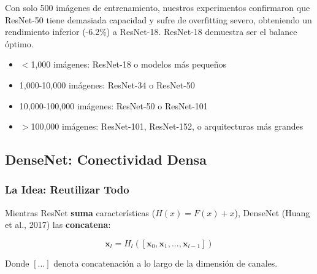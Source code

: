 \documentclass[12pt,a4paper]{article}
\begin{document}
Con solo 500 imágenes de entrenamiento, nuestros experimentos confirmaron que ResNet-50 tiene demasiada capacidad y sufre de overfitting severo, obteniendo un rendimiento inferior (-6.2\%) a ResNet-18. ResNet-18 demuestra ser el balance óptimo.

\begin{tipbox}
\begin{itemize}
    \item $<$1,000 imágenes: ResNet-18 o modelos más pequeños
    \item 1,000-10,000 imágenes: ResNet-34 o ResNet-50
    \item 10,000-100,000 imágenes: ResNet-50 o ResNet-101
    \item $>$100,000 imágenes: ResNet-101, ResNet-152, o arquitecturas más grandes
\end{itemize}
\end{tipbox}

\subsection{DenseNet: Conectividad Densa}

\subsubsection{La Idea: Reutilizar Todo}

Mientras ResNet \textbf{suma} características ($H(x) = F(x) + x$), DenseNet (Huang et al., 2017) las \textbf{concatena}:

\begin{equation}
\mathbf{x}_l = H_l([\mathbf{x}_0, \mathbf{x}_1, ..., \mathbf{x}_{l-1}])
\end{equation}

Donde $[...]$ denota concatenación a lo largo de la dimensión de canales.
\end{document}
